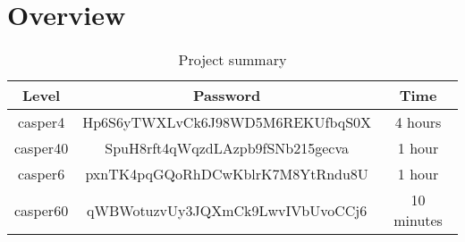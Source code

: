 \section{Overview}
\begin{table}[h]
	\centering
	\label{tbl:summary}
	\begin{tabular}{|c|c|c|}
		\hline
		\textbf{Level} & \textbf{Password} 								& \textbf{Time} \\ \hline
		casper4        & Hp6S6yTWXLvCk6J98WD5M6REKUfbqS0X               & 4 hours       \\ \hline
		casper40       & SpuH8rft4qWqzdLAzpb9fSNb215gecva				& 1 hour        \\ \hline
		casper6        & pxnTK4pqGQoRhDCwKblrK7M8YtRndu8U				& 1 hour        \\ \hline
		casper60       & qWBWotuzvUy3JQXmCk9LwvIVbUvoCCj6				& 10 minutes    \\ \hline
	\end{tabular}
	\caption{Project summary}
\end{table}